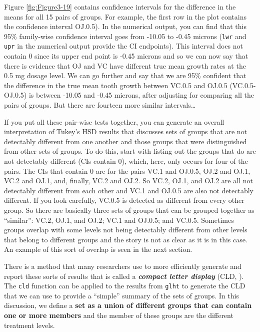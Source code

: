 \documentclass[]{book}
\theoremstyle{definition}
\theoremstyle{definition}
\theoremstyle{remark}
\begin{document}
Figure \ref{fig:Figure3-19} contains confidence intervals for the
difference in the means for all 15 pairs of groups. For example, the
first row in the plot contains the confidence interval OJ.0.5). In the
numerical output, you can find that this 95\% family-wise confidence
interval goes from -10.05 to -0.45 microns (\texttt{lwr} and
\texttt{upr} in the numerical output provide the CI endpoints). This
interval does not contain 0 since its upper end point is -0.45 microns
and so we can now say that there is evidence that OJ and VC have
different true mean growth rates at the 0.5 mg dosage level. We can go
further and say that we are 95\% confident that the difference in the
true mean tooth growth between VC.0.5 and OJ.0.5 (VC.0.5-OJ.0.5) is
between -10.05 and -0.45 microns, after adjusting for comparing all the
pairs of groups. But there are fourteen more similar intervals\ldots{}

If you put all these pair-wise tests together, you can generate an
overall interpretation of Tukey's HSD results that discusses sets of
groups that are not detectably different from one another and those
groups that were distinguished from other sets of groups. To do this,
start with listing out the groups that do are not detectably different
(CIs contain 0), which, here, only occurs for four of the pairs. The CIs
that contain 0 are for the pairs VC.1 and OJ.0.5, OJ.2 and OJ.1, VC.2
and OJ.1, and, finally, VC.2 and OJ.2. So VC.2, OJ.1, and OJ.2 are all
not detectably different from each other and VC.1 and OJ.0.5 are also
not detectably different. If you look carefully, VC.0.5 is detected as
different from every other group. So there are basically three sets of
groups that can be grouped together as ``similar'': VC.2, OJ.1, and
OJ.2; VC.1 and OJ.0.5; and VC.0.5. Sometimes groups overlap with some
levels not being detectably different from other levels that belong to
different groups and the story is not as clear as it is in this case. An
example of this sort of overlap is seen in the next section.

There is a method that many researchers use to more efficiently generate
and report these sorts of results that is called a \textbf{\emph{compact
letter display}} (CLD, \citet{Piepho2004}). The \texttt{cld} function
can be applied to the results from \texttt{glht} to generate the CLD
that we can use to provide a ``simple'' summary of the sets of groups.
In this discussion, we define a \textbf{set as a union of different
groups that can contain one or more members} and the member of these
groups are the different treatment levels.
\end{document}

